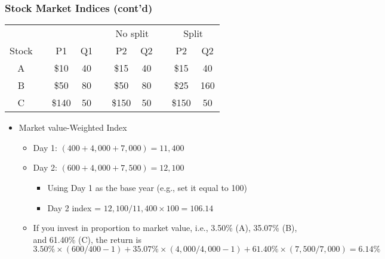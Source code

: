 \documentclass[10pt]{beamer}
\begin{document}
	
	\begin{frame}[t]
		\frametitle{Stock Market Indices (cont'd)}
		
		\begin{table}[]
			\begin{tabular}{cccccccccc}
				&  &  &  &  & \multicolumn{2}{c}{No split} & & \multicolumn{2}{c}{Split} \\ \cline{6-7} \cline{9-10} 
				Stock &  & P1    & Q1 &  & P2    & Q2  &  & P2    & Q2  \\ \cline{1-1} \cline{3-4} \cline{6-7} \cline{9-10} 
				A     &  & \$10  & 40 &  & \$15  & 40  &  & \$15  & 40  \\
				B     &  & \$50  & 80 &  & \$50  & 80 &  & \$25  & 160 \\
				C     &  & \$140 & 50 &  & \$150 & 50  &  & \$150 & 50 
			\end{tabular}
		\end{table}
		
		
		\begin{itemize}
			\item Market value-Weighted Index	
			\begin{itemize}
				\item Day 1: $ (400 + 4,000 + 7,000) = 11,400 $
				\item Day 2: $ (600 + 4,000 + 7,500) = 12,100 $
				\begin{itemize}
					\item Using Day 1 as the base year (e.g., set it equal to 100)
					\item Day 2 index = $12,100/11,400  \times 100 = 106.14 $
				\end{itemize}
				
				\item If you invest in proportion to market value, i.e., 3.50\% (A), 35.07\% (B), and 61.40\% (C), the return is $ 3.50\% \times (600/400-1) + 35.07\% \times (4,000/4,000-1) + 61.40\% \times (7,500/7,000) = 6.14\%  $
			\end{itemize}
			
		\end{itemize}
		
	\end{frame}
	
	
	
\end{document}

